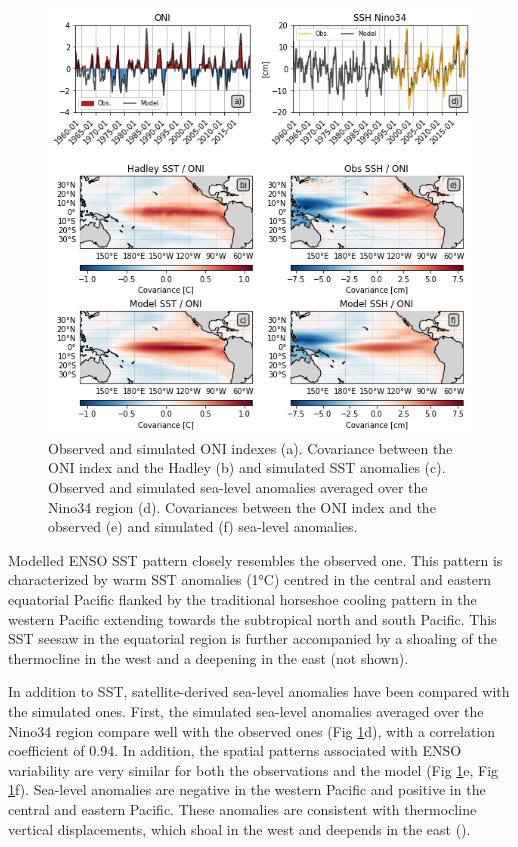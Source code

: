 \begin{figure}
	\centering
	\includegraphics[scale=0.6]{figs/fig1.png}
	\caption{Observed and simulated ONI indexes (a). Covariance between the ONI index and the Hadley (b) and simulated SST anomalies (c). Observed and simulated sea-level anomalies averaged over the Nino34 region (d). Covariances between the ONI index and the observed (e) and simulated (f) sea-level anomalies.}
	\label{fig:nemo-had-sst}
\end{figure}

Modelled ENSO SST  pattern closely resembles the observed one. This pattern is characterized by warm SST anomalies (1°C) centred in the central and eastern equatorial Pacific  flanked by the traditional horseshoe cooling pattern in the western Pacific extending towards the subtropical north and south Pacific. This SST seesaw in the equatorial region is further accompanied by a shoaling of the thermocline in the west and a deepening in the east (not shown).

In addition to SST, satellite-derived sea-level anomalies have been compared with the simulated ones. First, the simulated sea-level anomalies averaged over the Nino34 region compare well with the observed ones (Fig \ref{fig:nemo-had-sst}d), with a correlation coefficient of 0.94. In addition, the spatial patterns associated with ENSO variability are very similar for both the observations and the model (Fig \ref{fig:nemo-had-sst}e, Fig \ref{fig:nemo-had-sst}f). Sea-level anomalies are negative in the western Pacific and positive in the central and eastern Pacific. These anomalies are consistent with thermocline vertical displacements, which shoal in the west and deepends in the east ().

